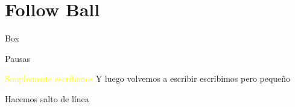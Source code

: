 \section{Follow Ball}
 \frame{\sectionpage}
 
\begin{frame}{Box}
    \begin{center}
        \textcolor{yellow}{} 

    \bigskip    
    
    
 \end{center}
\end{frame}
    
\begin{frame}{Pausas}
\small

\pause \textcolor{yellow} 
{Simplemente escribimos}
\pause 
  Y luego volvemos a escribir
\pause 
\small 
escribimos pero pequeño

\pause 
\bigskip 
Hacemos salto de línea
\end{frame}
    
   
